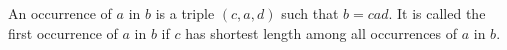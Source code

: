 An occurrence of $a$ in $b$ is a triple $(c, a, d)$ such that $b = cad$. It is called the first occurrence of $a$ in $b$ if $c$ has shortest length among all occurrences of $a$ in $b$.
